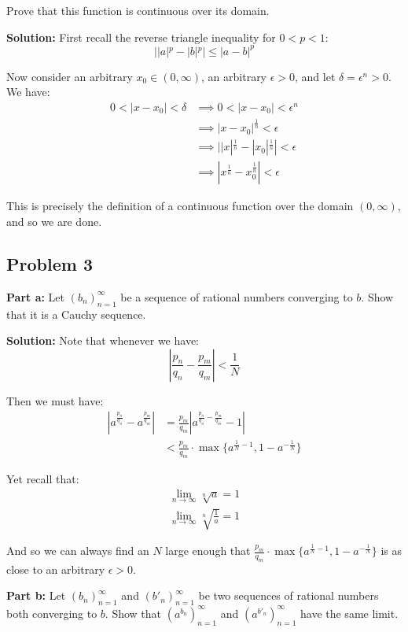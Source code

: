 \documentclass{article}
\begin{document}
Prove that this function is continuous over its domain.
\bigskip

\noindent\textbf{Solution:} First recall the reverse triangle inequality for $0<p<1$:
$$||a|^p-|b|^p|\le|a-b|^p$$

Now consider an arbitrary $x_0\in(0,\infty)$, an arbitrary $\epsilon>0$, and let $\delta=\epsilon^n>0$. We have:
\begin{align*}
  0<|x-x_0|<\delta&\implies0<|x-x_0|<\epsilon^n\tag{$\delta=\epsilon^n$}\\
  &\implies |x-x_0|^{\frac{1}{n}}<\epsilon\tag{$n$th root is increasing}\\
  &\implies||x|^{\frac{1}{n}}-|x_0|^{\frac{1}{n}}|<\epsilon\tag{reverse triangle inequality}\\
  &\implies|x^{\frac{1}{n}}-x_0^{\frac{1}{n}}|<\epsilon\tag{domain is positive}
\end{align*}

This is precisely the definition of a continuous function over the domain $(0,\infty)$, and so we are done.

\subsection*{Problem 3}
\noindent\textbf{Part a:} Let $(b_n)_{n=1}^\infty$ be a sequence of rational numbers converging to $b$. Show that it is a Cauchy sequence.
\bigskip

\noindent\textbf{Solution:} Note that whenever we have:
$$\left|\frac{p_n}{q_n}-\frac{p_m}{q_m}\right|<\frac{1}{N}$$

Then we must have:
\begin{align*}
  \left|a^{\frac{p_n}{q_n}}-a^{\frac{p_m}{q_m}}\right|&=\frac{p_m}{q_m}\left|a^{\frac{p_n}{q_n}-\frac{p_m}{q_m}}-1\right|\tag{all positive}\\
  &<\frac{p_m}{q_m}\cdot\max\{a^{\frac{1}{N}-1},1-a^{-\frac{1}{N}}\}
\end{align*}

Yet recall that:
\begin{gather*}
  \lim_{n\to\infty}\sqrt[n]{a}=1\\
  \lim_{n\to\infty}\sqrt[n]{\frac{1}{a}}=1
\end{gather*}

And so we can always find an $N$ large enough that $\frac{p_m}{q_m}\cdot\max\{a^{\frac{1}{N}-1},1-a^{-\frac{1}{N}}\}$ is as close to an arbitrary $\epsilon>0$.
\bigskip

\noindent\textbf{Part b:} Let $(b_n)_{n=1}^\infty$ and $(b'_n)_{n=1}^\infty$ be two sequences of rational numbers both converging to $b$. Show that $(a^{b_n})_{n=1}^\infty$ and $(a^{b'_n})_{n=1}^\infty$ have the same limit.
\bigskip
\end{document}
